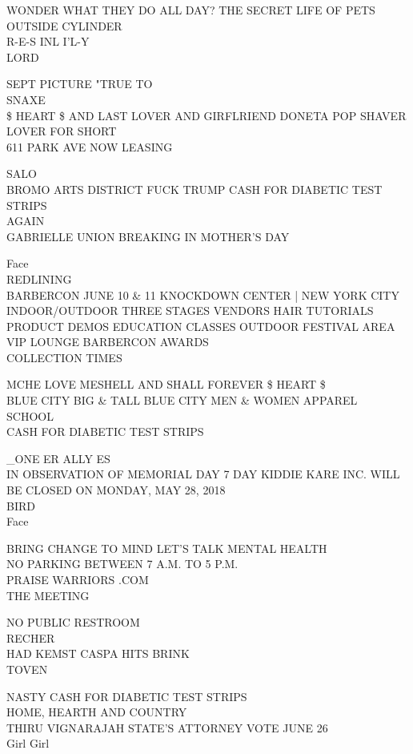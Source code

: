 \documentclass[10pt,letterpaper]{article}
\begin{document}
WONDER WHAT THEY DO ALL DAY?  THE SECRET LIFE OF PETS\\
OUTSIDE CYLINDER\\
R{-}E{-}S INL I'L{-}Y\\
LORD

SEPT PICTURE "TRUE TO\\
SNAXE\\
\$ HEART \$ AND LAST LOVER AND GIRFLRIEND DONETA POP SHAVER LOVER FOR SHORT\\
611 PARK AVE NOW LEASING

SALO\\
BROMO ARTS DISTRICT FUCK TRUMP CASH FOR DIABETIC TEST STRIPS\\
AGAIN\\
GABRIELLE UNION BREAKING IN MOTHER'S DAY

Face\\
REDLINING\\
BARBERCON JUNE 10 \& 11 KNOCKDOWN CENTER | NEW YORK CITY INDOOR/OUTDOOR THREE STAGES VENDORS HAIR TUTORIALS PRODUCT DEMOS EDUCATION CLASSES OUTDOOR FESTIVAL AREA VIP LOUNGE BARBERCON AWARDS\\
COLLECTION TIMES

MCHE LOVE MESHELL AND SHALL FOREVER \$ HEART \$\\
BLUE CITY BIG \& TALL BLUE CITY MEN \& WOMEN APPAREL\\
SCHOOL\\
CASH FOR DIABETIC TEST STRIPS

\_ONE ER ALLY ES\\
IN OBSERVATION OF MEMORIAL DAY 7 DAY KIDDIE KARE INC. WILL BE CLOSED ON MONDAY, MAY 28, 2018\\
BIRD\\
Face

BRING CHANGE TO MIND LET'S TALK MENTAL HEALTH\\
NO PARKING BETWEEN 7 A.M. TO 5 P.M.\\
PRAISE WARRIORS .COM\\
THE MEETING

NO PUBLIC RESTROOM\\
RECHER\\
HAD KEMST CASPA HITS BRINK\\
TOVEN

NASTY CASH FOR DIABETIC TEST STRIPS\\
HOME, HEARTH AND COUNTRY\\
THIRU VIGNARAJAH STATE'S ATTORNEY VOTE JUNE 26\\
Girl Girl
\end{document}
